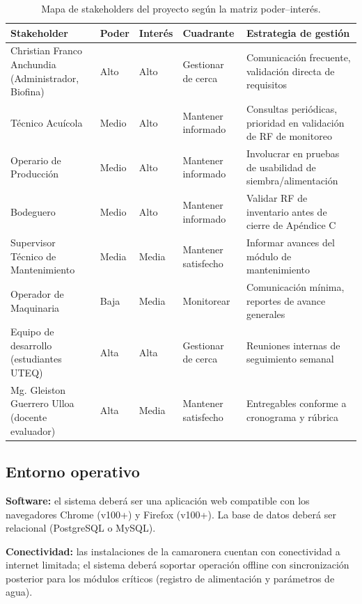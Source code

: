 \documentclass[11pt,a4paper]{article}
\begin{document}
\captionsetup{width=\textwidth}
\begin{longtable}{|p{4cm}|p{1.3cm}|p{1.5cm}|p{3cm}|p{5cm}|}
\caption{Mapa de stakeholders del proyecto según la matriz poder--interés.}
\label{tab:stakeholders} \\
\hline
\textbf{Stakeholder} & \textbf{Poder} & \textbf{Interés} & \textbf{Cuadrante} & \textbf{Estrategia de gestión} \\
\hline
Christian Franco Anchundia (Administrador, Biofina) & Alto & Alto & Gestionar de cerca & Comunicación frecuente, validación directa de requisitos \\
\hline
Técnico Acuícola & Medio & Alto & Mantener informado & Consultas periódicas, prioridad en validación de RF de monitoreo \\
\hline
Operario de Producción & Medio & Alto & Mantener informado & Involucrar en pruebas de usabilidad de siembra/alimentación \\
\hline
Bodeguero & Medio & Alto & Mantener informado & Validar RF de inventario antes de cierre de Apéndice C \\
\hline
Supervisor Técnico de Mantenimiento & Media & Media & Mantener satisfecho & Informar avances del módulo de mantenimiento \\
\hline
Operador de Maquinaria & Baja & Media & Monitorear & Comunicación mínima, reportes de avance generales \\
\hline
Equipo de desarrollo (estudiantes UTEQ) & Alta & Alta & Gestionar de cerca & Reuniones internas de seguimiento semanal \\
\hline
Mg. Gleiston Guerrero Ulloa (docente evaluador) & Alta & Media & Mantener satisfecho & Entregables conforme a cronograma y rúbrica \\
\hline
\end{longtable}

\subsection{Entorno operativo}
\textbf{Software:} el sistema deberá ser una aplicación web compatible con los navegadores Chrome (v100+) y Firefox (v100+). La base de datos deberá ser relacional (PostgreSQL o MySQL).

\textbf{Conectividad:} las instalaciones de la camaronera cuentan con conectividad a internet limitada; el sistema deberá soportar operación offline con sincronización posterior para los módulos críticos (registro de alimentación y parámetros de agua).
\end{document}
